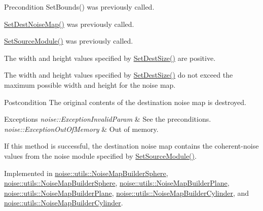 \begin{DoxyPrecond}{Precondition}
Set\+Bounds() was previously called. 

\hyperlink{classnoise_1_1utils_1_1_noise_map_builder_a07555b64324efbb16f0ef244c4fed8b7}{Set\+Dest\+Noise\+Map()} was previously called. 

\hyperlink{classnoise_1_1utils_1_1_noise_map_builder_aa39e8ea292711aa3a7627ddcaee4f12f}{Set\+Source\+Module()} was previously called. 

The width and height values specified by \hyperlink{classnoise_1_1utils_1_1_noise_map_builder_abad282f0cbe67824b73c580f611a7bd0}{Set\+Dest\+Size()} are positive. 

The width and height values specified by \hyperlink{classnoise_1_1utils_1_1_noise_map_builder_abad282f0cbe67824b73c580f611a7bd0}{Set\+Dest\+Size()} do not exceed the maximum possible width and height for the noise map.
\end{DoxyPrecond}
\begin{DoxyPostcond}{Postcondition}
The original contents of the destination noise map is destroyed.
\end{DoxyPostcond}

\begin{DoxyExceptions}{Exceptions}
{\em noise\+::\+Exception\+Invalid\+Param} & See the preconditions. \\
\hline
{\em noise\+::\+Exception\+Out\+Of\+Memory} & Out of memory.\\
\hline
\end{DoxyExceptions}
If this method is successful, the destination noise map contains the coherent-\/noise values from the noise module specified by \hyperlink{classnoise_1_1utils_1_1_noise_map_builder_aa39e8ea292711aa3a7627ddcaee4f12f}{Set\+Source\+Module()}. 

Implemented in \hyperlink{classnoise_1_1utils_1_1_noise_map_builder_sphere_a39ac9c3dba8db40b6d5d34c2ec54704b}{noise\+::utils\+::\+Noise\+Map\+Builder\+Sphere}, \hyperlink{classnoise_1_1utils_1_1_noise_map_builder_sphere_a3596d6c68110cfaa10b6624a5670db70}{noise\+::utils\+::\+Noise\+Map\+Builder\+Sphere}, \hyperlink{classnoise_1_1utils_1_1_noise_map_builder_plane_a81d553c3215dc657dfe2cdbc3264a045}{noise\+::utils\+::\+Noise\+Map\+Builder\+Plane}, \hyperlink{classnoise_1_1utils_1_1_noise_map_builder_plane_a5a22db6eda87825af47cfa598d4c1fb4}{noise\+::utils\+::\+Noise\+Map\+Builder\+Plane}, \hyperlink{classnoise_1_1utils_1_1_noise_map_builder_cylinder_a684d087e172d16c1c754e48c69ac12a0}{noise\+::utils\+::\+Noise\+Map\+Builder\+Cylinder}, and \hyperlink{classnoise_1_1utils_1_1_noise_map_builder_cylinder_a0c136038ea3fa328962c437a28269726}{noise\+::utils\+::\+Noise\+Map\+Builder\+Cylinder}.

